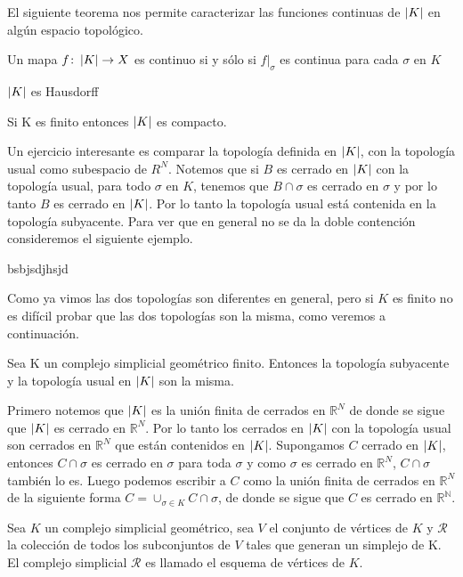 El siguiente teorema nos permite caracterizar las funciones continuas de $\left| K \right|$ en algún espacio topológico.
\begin{Teo}\label{ttc}
Un mapa $f\colon \left| K \right|\rightarrow X$ es continuo si y sólo si $f|_{\sigma}$ es continua para cada $\sigma$ en $K$
\end{Teo}
\begin{Teo}
$\left| K \right|$ es Hausdorff
\end{Teo}
\begin{Teo}
Si K es finito entonces $\left| K \right|$ es compacto.
\end{Teo}
Un ejercicio interesante es comparar la topología definida en $\left| K \right|$, con la topología usual como subespacio de $R^{N}$. Notemos que si $B$ es cerrado en $\left| K \right|$ con la topología usual, para todo $\sigma$ en $K$, tenemos que $B\cap\sigma$ es cerrado en $\sigma$ y por lo tanto $B$ es cerrado en $\left| K \right|$. Por lo tanto la topología usual está contenida en la topología subyacente. Para ver que en general no se da la doble contención consideremos el siguiente ejemplo.
\begin{Ejem}
bsbjsdjhsjd
\end{Ejem}
Como ya vimos las dos topologías son diferentes en general, pero si $K$ es finito no es difícil probar que las dos topologías son la misma, como veremos a continuación.
\begin{Prop}
Sea K un complejo simplicial geométrico finito. Entonces la topología subyacente y la topología usual en $\left| K \right|$ son la misma.
\end{Prop}
\begin{Dem}

Primero notemos que $\left| K \right|$ es la unión finita de cerrados en $\mathbb{R}^N$ de donde se sigue que $\left| K \right|$ es cerrado en $\mathbb{R}^N$. Por lo tanto los cerrados en $\left| K \right|$ con la topología usual son cerrados en $\mathbb{R}^N$ que están contenidos en $\left| K \right|$.
Supongamos $C$ cerrado en $\left| K \right|$, entonces $C\cap\sigma$ es cerrado en $\sigma$ para toda $\sigma$ y como $\sigma$ es cerrado en $\mathbb{R}^N$, $C\cap\sigma$ también lo es. Luego podemos escribir a $C$ como la unión finita de cerrados en  $\mathbb{R}^N$ de la siguiente forma $C=\cup_{\sigma\in K}C\cap\sigma$, de donde se sigue que $C$ es cerrado en $\mathbb{R^N}$.
\end{Dem}
\begin{Defi}
Sea $K$ un complejo simplicial geométrico, sea $V$ el conjunto de vértices de $K$ y $\mathcal{R}$ la colección de todos los subconjuntos de $V$ tales que generan un simplejo de K. El complejo simplicial $\mathcal{R}$ es llamado el esquema de vértices de $K$.
\end{Defi}

